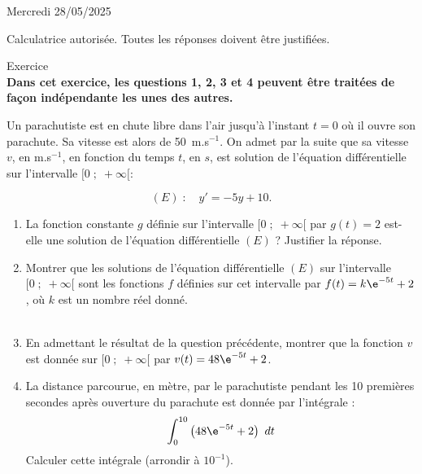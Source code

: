 \documentclass[a4paper,11pt,eval]{nsi}
\newcounter{exoNum}
\newcommand{\exo}[1]
{
	\addtocounter{exoNum}{1}
	{\titlefont\color{UGLiBlue}\Large Exercice\ \theexoNum\ \normalsize{#1}}\smallskip	
}
\begin{document}
\textcolor{UGLiBlue}{Mercredi 28/05/2025}\\
\maketitle
\begin{center}
	Calculatrice autorisée. Toutes les réponses doivent être justifiées.
\end{center}






\exo{}\\
\textbf{Dans cet exercice, les questions 1, 2, 3 et 4 peuvent être traitées de façon indépendante les unes des autres.}

Un parachutiste est en chute libre dans l'air jusqu'à l'instant $t = 0$ où il ouvre son parachute. Sa vitesse est alors de 50~m.s$^{-1}$. On admet par la suite que sa vitesse $v$, en m.s$^{-1}$, en fonction du temps $t$, en $s$, est solution de l'équation différentielle sur l'intervalle $[0\;;\;+\infty[$:

\[(E)\;:\quad y'=-5y+10.\]



\begin{enumerate}
    \item La fonction constante $g$ définie sur l'intervalle $[0\;;\;+\infty[$ par $g(t)=2$ est-elle une solution de l'équation différentielle $(E)$ ? 
    Justifier la réponse.\\[.5em]

    \item Montrer que les solutions de l'équation différentielle $(E)$ sur l'intervalle $[0\;;\;+\infty[$ sont les fonctions $f$ définies sur cet intervalle par $f(t)=k\e^{-5t}+2$, où $k$ est un nombre réel donné.\\[.5em]
    \\

    \item En admettant le résultat de la question précédente, montrer que la fonction $v$ est donnée sur $[0\;;\;+\infty[$ par $v(t) = 48 \e^{-5t} + 2$.\\[.5em]

    \item La distance parcourue, en mètre, par le parachutiste pendant les 10 premières secondes après ouverture du parachute est donnée  par l'intégrale :
    \[\displaystyle\int_{0}^{10} \left ( 48 \e^{-5t} +2 \right ) \ dt\]
    Calculer cette intégrale (arrondir à $10^{-1}$).\\[.5em]
\end{enumerate}
\end{document}
